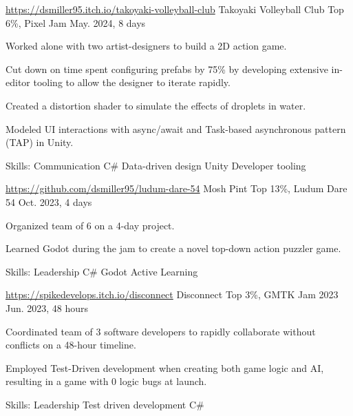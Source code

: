 \begin{cventries}
  \cventry
 {\href{https://dsmiller95.itch.io/takoyaki-volleyball-club}{https://dsmiller95.itch.io/takoyaki-volleyball-club}} %
 {Takoyaki Volleyball Club} %
 {Top 6\%, Pixel Jam} %
 {May. 2024, 8 days} %
 {
      \begin{cvitems} %
        \item {Worked alone with two artist-designers to build a 2D action game.}
        \item {Cut down on time spent configuring prefabs by 75\% by developing extensive in-editor tooling to allow the designer to iterate rapidly.}
        \item {Created a distortion shader to simulate the effects of droplets in water.}
        \item {Modeled UI interactions with async/await and Task-based asynchronous pattern (TAP) in Unity.}
        \item {Skills: Communication \textbullet{} C\# \textbullet{} Data-driven design \textbullet{} Unity \textbullet{} Developer tooling }
      \end{cvitems}
 }

  \cventry
 {\href{https://github.com/dsmiller95/ludum-dare-54}{https://github.com/dsmiller95/ludum-dare-54}} %
 {Mosh Pint} %
 {Top 13\%, Ludum Dare 54} %
 {Oct. 2023, 4 days} %
 {
      \begin{cvitems} %
        \item {Organized team of 6 on a 4-day project.}
        \item {Learned Godot during the jam to create a novel top-down action puzzler game.}
        \item {Skills: Leadership \textbullet{} C\# \textbullet{} Godot \textbullet{} Active Learning}
      \end{cvitems}
 }

  \cventry
 {\href{https://spikedevelops.itch.io/disconnect}{https://spikedevelops.itch.io/disconnect}} %
 {Disconnect} %
 {Top 3\%, GMTK Jam 2023} %
 {Jun. 2023, 48 hours} %
 {
      \begin{cvitems} %
        \item {Coordinated team of 3 software developers to rapidly collaborate without conflicts on a 48-hour timeline.}
        \item {Employed Test-Driven development when creating both game logic and AI, resulting in a game with 0 logic bugs at launch.}
        \item {Skills: Leadership \textbullet{} Test driven development \textbullet{} C\#}
      \end{cvitems}
 }


\end{cventries}
